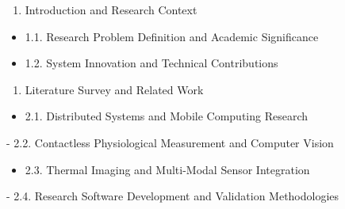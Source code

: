 \documentclass[11pt,a4paper]{article}
\begin{document}
\begin{enumerate}
\item Introduction and Research Context

\end{enumerate}
\begin{itemize}
\item 1.1. Research Problem Definition and Academic Significance
\item 1.2. System Innovation and Technical Contributions

\end{itemize}
\begin{enumerate}
\item Literature Survey and Related Work

\end{enumerate}
\begin{itemize}
\item 2.1. Distributed Systems and Mobile Computing Research
\end{itemize}
-
2.2. Contactless Physiological Measurement and Computer Vision
\begin{itemize}
\item 2.3. Thermal Imaging and Multi-Modal Sensor Integration
\end{itemize}
-
2.4. Research Software Development and Validation Methodologies
\end{document}
